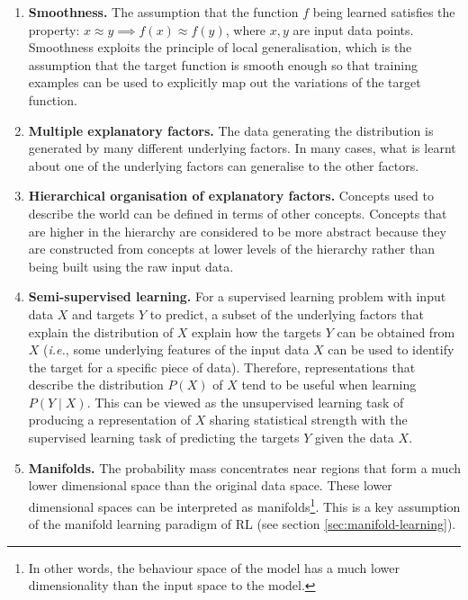 \begin{enumerate}
    \item \textbf{Smoothness.}
    The assumption that the function $f$ being learned satisfies the property: $x \approx y \implies f(x) \approx f(y)$, where $x,y$ are input data points.
    Smoothness exploits the principle of local generalisation, which is the assumption that the target function is smooth enough so that training examples can be used to explicitly map out the variations of the target function.
    
    \item \textbf{Multiple explanatory factors.}
    The data generating the distribution is generated by many different underlying factors.
    In many cases, what is learnt about one of the underlying factors can generalise to the other factors.
    
    \item \textbf{Hierarchical organisation of explanatory factors.}
    Concepts used to describe the world can be defined in terms of other concepts.
    Concepts that are higher in the hierarchy are considered to be more abstract because they are constructed from concepts at lower levels of the hierarchy rather than being built using the raw input data.
    
    \item \textbf{Semi-supervised learning.}
    For a supervised learning problem with input data $X$ and targets $Y$ to predict, a subset of the underlying factors that explain the distribution of $X$ explain how the targets $Y$ can be obtained from $X$ (\textit{i.e.}, some underlying features of the input data $X$ can be used to identify the target for a specific piece of data).
    Therefore, representations that describe the distribution $P(X)$ of $X$ tend to be useful when learning $P(Y \mid X)$.
    This can be viewed as the unsupervised learning task of producing a representation of $X$ sharing statistical strength with the supervised learning task of predicting the targets $Y$ given the data $X$.
    
    \item \textbf{Manifolds.}
    The probability mass concentrates near regions that form a much lower dimensional space than the original data space.
    These lower dimensional spaces can be interpreted as manifolds\footnote{In other words, the behaviour space of the model has a much lower dimensionality than the input space to the model.}.
    This is a key assumption of the manifold learning paradigm of RL (see section \ref{sec:manifold-learning}).
    

\end{enumerate}
